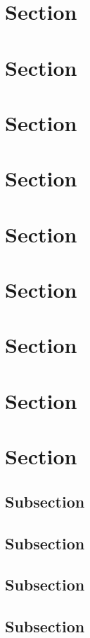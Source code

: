\documentclass[paper=a5,twoside,fontsize=10pt, DIV=calc, headings=small,bibliography=totoc, listof=totoc]{scrbook}
\begin{document}
\section{Section}

\section{Section}

\section{Section}

\section{Section}

\section{Section}

\section{Section}

\section{Section}

\section{Section}

\section{Section}

\subsection{Subsection}
\label{ssec:example}
\blindtext

\subsection{Subsection}
\subsection{Subsection}
\subsection{Subsection}
\end{document}
